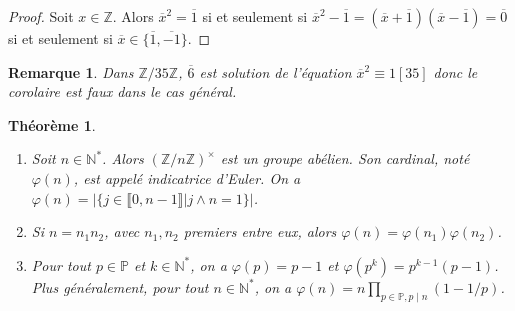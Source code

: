 \documentclass[12pt]{report}
\newtheorem{thm}{Théorème}[chapter]
\newtheorem*{rem}{Remarque}
\newcommand{\N}{\mathbb{N}}
\newcommand{\Z}{\mathbb{Z}}
\begin{document}
\begin{proof}
Soit $x\in \Z$. Alors $\overline{x}^2 =\overline{1}$ si et seulement si $\overline{x}^2-\overline{1}= (\overline{x}+\overline{1})(\overline{x}-\overline{1})=\overline{0}$ si et seulement si $\overline{x}\in \{\overline{1},\overline{-1}\}$.
\end{proof}

\begin{rem}
Dans $\mathbb{Z}/35 \mathbb{Z}$, $\overline{6}$ est solution de l'équation $\overline{x}^2\equiv 1[35]$ donc le corolaire est faux dans le cas général.
\end{rem}



\begin{thm}
 \begin{enumerate}
\item Soit $n\in \N^*$. Alors  $(\mathbb{Z}/n \mathbb{Z})^{\times}$ est un groupe abélien. Son cardinal, noté $\varphi(n)$, est appelé indicatrice d'Euler. On a $\varphi(n)=|\{j\in \llbracket 0,n-1\rrbracket|j\wedge n=1\}|$. \par 

\item Si $n=n_1n_2$, avec $n_1,n_2$ premiers entre eux, alors $\varphi(n)=\varphi(n_1)\varphi(n_2)$.

\item Pour tout  $p\in \mathbb{P}$ et $k\in \N^*$, on a $\varphi(p)=p-1$ et $\varphi(p^k)=p^{k-1}(p-1)$. Plus généralement, pour tout $n \in \mathbb{N}^*$, on a $\varphi(n)= n \prod_{p\in \mathbb{P}, p\mid n}(1-1/p)$.
\end{enumerate}

\end{thm}
\end{document}
